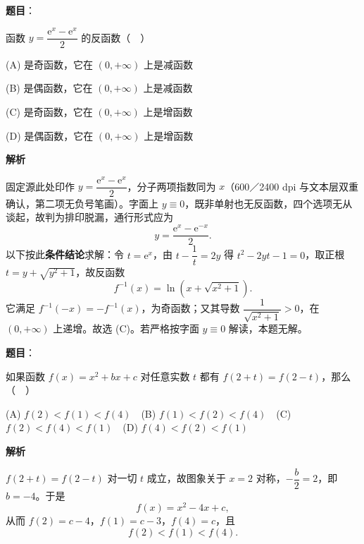 \begin{answer}

\textbf{题目}：

函数 \(y=\dfrac{\mathrm{e}^{x}-\mathrm{e}^{x}}{2}\) 的反函数（　）

(A) 是奇函数，它在 \((0,+\infty)\) 上是减函数

(B) 是偶函数，它在 \((0,+\infty)\) 上是减函数

(C) 是奇函数，它在 \((0,+\infty)\) 上是增函数

(D) 是偶函数，它在 \((0,+\infty)\) 上是增函数

\textbf{解析}

固定源此处印作 \(y=\dfrac{\mathrm{e}^{x}-\mathrm{e}^{x}}{2}\)，分子两项指数同为 \(x\)（600／2400 dpi 与文本层双重确认，第二项无负号笔画）。字面上 \(y\equiv0\)，既非单射也无反函数，四个选项无从谈起，故判为排印脱漏，通行形式应为
\nopagebreak[4]
\[
y=\frac{\mathrm{e}^{x}-\mathrm{e}^{-x}}{2}.
\]
以下按此\textbf{条件结论}求解：令 \(t=\mathrm{e}^x\)，由 \(t-\dfrac1t=2y\) 得 \(t^2-2yt-1=0\)，取正根 \(t=y+\sqrt{y^2+1}\)，故反函数
\nopagebreak[4]
\[
f^{-1}(x)=\ln\left(x+\sqrt{x^2+1}\right).
\]
它满足 \(f^{-1}(-x)=-f^{-1}(x)\)，为奇函数；又其导数 \(\dfrac{1}{\sqrt{x^2+1}}>0\)，在 \((0,+\infty)\) 上递增。故选 (C)。若严格按字面 \(y\equiv0\) 解读，本题无解。


\end{answer}
\begin{answer}

\textbf{题目}：

如果函数 \(f(x)=x^{2}+bx+c\) 对任意实数 \(t\) 都有 \(f(2+t)=f(2-t)\)，那么（　）

(A) \(f(2)<f(1)<f(4)\)　(B) \(f(1)<f(2)<f(4)\)　(C) \(f(2)<f(4)<f(1)\)　(D) \(f(4)<f(2)<f(1)\)

\textbf{解析}

\(f(2+t)=f(2-t)\) 对一切 \(t\) 成立，故图象关于 \(x=2\) 对称，\(-\dfrac{b}{2}=2\)，即 \(b=-4\)。于是
\nopagebreak[4]
\[
f(x)=x^2-4x+c,
\]
从而 \(f(2)=c-4\)，\(f(1)=c-3\)，\(f(4)=c\)，且
\nopagebreak[4]
\[
f(2)<f(1)<f(4).
\]


\end{answer}
